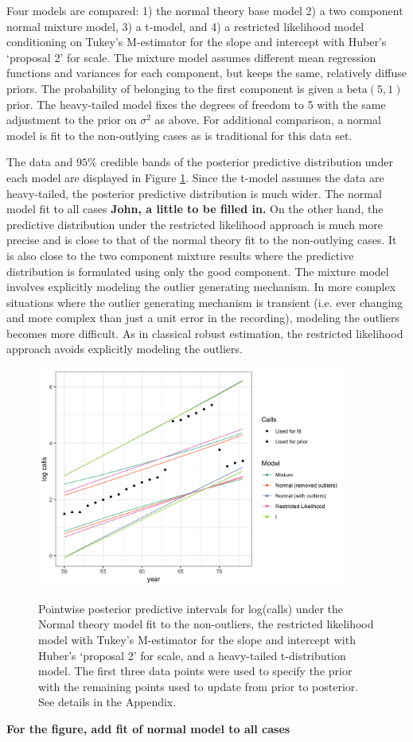 \documentclass[ba]{imsart}
\begin{document}
Four models are compared: 1) the normal theory base model 2) a two component normal mixture model, 3) a t-model, and 4) a restricted likelihood model conditioning on Tukey's M-estimator for the slope and intercept with Huber's `proposal 2'  for scale. The mixture model assumes different mean regression functions and variances for each component, but keeps the same, relatively diffuse priors. The probability of belonging to the first component is given a $\text{beta}(5,1)$ prior. The heavy-tailed model fixes the degrees of freedom to 5 with the same adjustment to the prior on $\sigma^{2}$ as above. For additional comparison, a normal model is fit to the non-outlying cases as is traditional for this data set.  

The data and  $95\%$ credible bands of the posterior predictive distribution under each model are displayed in Figure \ref{fig:calls_predictive}. Since the t-model assumes the data are heavy-tailed, the posterior predictive distribution is much wider.  The normal model fit to all cases {\bf John, a little to be filled in.} On the other hand, the predictive distribution under the restricted likelihood approach is much more precise and is close to that of the normal theory fit to the non-outlying cases. It is also close to the two component mixture results where the predictive distribution is formulated using only the good component. The mixture model involves explicitly modeling the outlier generating mechanism. In more complex situations where the outlier generating mechanism is transient (i.e. ever changing and more complex than just a unit error in the recording), modeling the outliers becomes more difficult. As in classical robust estimation, the restricted likelihood approach avoids explicitly modeling the outliers. 
\begin{figure}[t]
\centering
{\includegraphics[width = 4in]{figs/calls_predictive.png}}
\caption{Pointwise posterior predictive intervals for log(calls) under the Normal theory model fit to the non-outliers, the restricted likelihood model with Tukey's M-estimator for the slope and intercept with Huber's `proposal 2'  for scale, and a heavy-tailed t-distribution model. The first three data points were used to specify the prior with the remaining points used to update from prior to posterior. See details in the Appendix.}
\label{fig:calls_predictive}
\end{figure}
{\bf For the figure, add fit of normal model to all cases}
\end{document}

